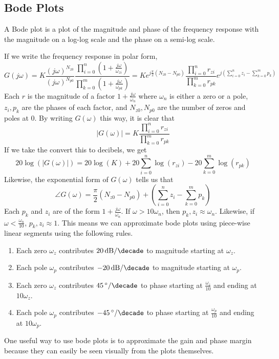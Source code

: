 \subsection{Bode Plots}
\begin{definition}
  A Bode plot is a plot of the magnitude and phase of the frequency response with the magnitude on a log-log scale and the phase on a semi-log scale.
  \label{defn:bode-plot}
\end{definition}
If we write the frequency response in polar form,
\[
  G(j\omega) = K \frac{(j\omega)^{N_{z0}}}{(j\omega)^{N_{p0}}}\frac{\prod_{i=0}^{n}{(1+\frac{j\omega}{\omega_{zi}})}}{\prod_{k=0}^{m}{(1+\frac{j\omega}{\omega_{pk}})}} = Ke^{j\frac{\pi}{2}(N_{z0}-N_{p0})} \frac{\prod_{i=0}^{n}{r_{zi}}}{\prod_{k=0}^{m}{r_{pk}}} e^{j(\sum_{i=0}^{n}{z_i} - \sum_{k=0}^{m}{p_k})}
\]
Each $r$ is the magnitude of a factor $1 + \frac{j\omega}{\omega_n}$ where $\omega_n$ is either a zero or a pole, $z_i, p_k$ are the phases of each factor, and $N_{z0}, N_{p0}$ are the number of zeros and poles at 0.
By writing $G(\omega)$ this way, it is clear that 
\[
  |G(\omega)| = K \frac{\prod_{i=0}^{n}{r_{zi}}}{\prod_{k=0}^{m}{r_{pk}}}
\]
If we take the convert this to decibels, we get 
\[
  20\log(|G(\omega)|) = 20\log(K) + 20\sum_{i=0}^{n}{\log(r_{zi})} - 20\sum_{k=0}^{m}{\log(r_{pk})}
\]
Likewise, the exponential form of $G(\omega)$ tells us that $$\angle G(\omega) = \frac{\pi}{2}(N_{z0}-N_{p0})+ (\sum_{i=0}^{n}{z_i} - \sum_{k=0}^{m}{p_k})$$
Each $p_k$ and $z_i$ are of the form $1 + \frac{j\omega}{\omega_n}$.
If $\omega > 10\omega_n$, then $p_k, z_i \approx \omega_n$. Likewise, if $\omega < \frac{\omega_n}{10}$, $p_k, z_i \approx 1$.
This means we can approximate bode plots using piece-wise linear segments using the following rules.
\begin{enumerate}
  \item Each zero $\omega_z$ contributes $\SI[per-mode=symbol]{20}{\decibel\per\decade}$ to magnitude starting at $\omega_z$.
  \item Each pole $\omega_p$ contributes $\SI[per-mode=symbol]{-20}{\decibel\per\decade}$ to magnitude starting at $\omega_p$.
  \item Each zero $\omega_z$ contributes $\SI[per-mode=symbol]{45}{\degree\per\decade}$ to phase starting at $\frac{\omega_z}{10}$ and ending at $10\omega_z$.
  \item Each pole $\omega_p$ contributes $\SI[per-mode=symbol]{-45}{\degree\per\decade}$ to phase starting at $\frac{\omega_p}{10}$ and ending at $10\omega_p$.
\end{enumerate}
One useful way to use bode plots is to approximate the gain and phase margin because they can easily be seen visually from the plots themselves.
